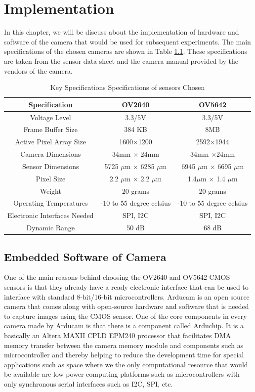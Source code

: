 \chapter{Implementation}
In this chapter, we will be discuss about the implementation of hardware and software of the camera that would be used for subsequent experiments.
The main specifications of the chosen cameras are shown in Table \ref{tbl:camera_specs}. These specifications are taken from the sensor data sheet and the camera manual provided by the vendors of the camera\cite{OV2640Arducam}\cite{OV5642Arducam}\cite{OV2640DS}\cite{OV5642DS}.  
\begin{table}[]
\centering
\caption{ Key Specifications Specifications of sensors Chosen}
\label{tbl:camera_specs}
\begin{tabular}{|c|c|c|}
\hline
Specification & OV2640 &  OV5642 \\
\hline
Voltage Level & 3.3/5V &  3.3/5V\\
 \hline
Frame Buffer Size & 384 KB & 8MB \\
 \hline
 Active Pixel Array Size& 1600$\times$1200&  2592$\times$1944 \\
 \hline  
 Camera Dimensions & 34mm $\times$ 24mm & 34mm $\times$24mm\\
 \hline
 Sensor Dimensions & 5725 $\mu$m $\times$ 6285 $\mu$m& 6945 $\mu$m $\times$ 6695 $\mu$m\\
 \hline
 Pixel Size & 2.2 $\mu$m $\times$ 2.2 $\mu$m & 1.4$\mu$m $\times$ 1.4 $\mu$m\\
 \hline
 Weight & 20 grams & 20 grams \\
 \hline
 Operating Temperatures & -10 to 55 degree celsius & -10 to 55 degree celsius \\
 \hline
 Electronic Interfaces Needed & SPI, I2C & SPI, I2C\\
 \hline
 Dynamic Range & 50 dB & 68 dB \\
 \hline
\end{tabular}
\end{table}
\section{Embedded Software of Camera}
One of the main reasons behind choosing the OV2640 and OV5642 CMOS sensors is that they already have a ready electronic interface that can be used to interface with standard 8-bit/16-bit microcontrollers. Arducam is an open source camera that comes along with open-source hardware and software that is needed to capture images using the CMOS sensor. One of the core components in every camera made by Arducam is that there is a component called Arduchip\cite{Arduchip}. It is a basically an Altera MAXII CPLD EPM240 processor that facilitates DMA memory transfer between the camera memory module and components such as microcontroller and thereby helping to reduce the development time for special applications such as space where we the only computational resource that would be available are low power computing platforms such as microcontrollers with only synchronous serial interfaces such as I2C, SPI, etc. 

